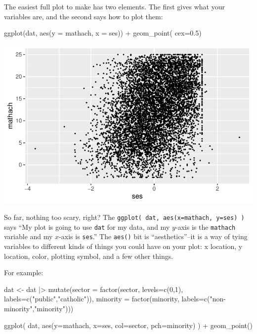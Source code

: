 \documentclass[
  letterpaper,
  DIV=11,
  numbers=noendperiod]{scrreprt}
\newenvironment{Shaded}{}{}
\newcommand{\AttributeTok}[1]{\textcolor[rgb]{0.49,0.56,0.16}{#1}}
\newcommand{\DecValTok}[1]{\textcolor[rgb]{0.25,0.63,0.44}{#1}}
\newcommand{\FloatTok}[1]{\textcolor[rgb]{0.25,0.63,0.44}{#1}}
\newcommand{\FunctionTok}[1]{\textcolor[rgb]{0.02,0.16,0.49}{#1}}
\newcommand{\NormalTok}[1]{#1}
\newcommand{\OtherTok}[1]{\textcolor[rgb]{0.00,0.44,0.13}{#1}}
\newcommand{\SpecialCharTok}[1]{\textcolor[rgb]{0.25,0.44,0.63}{#1}}
\newcommand{\StringTok}[1]{\textcolor[rgb]{0.25,0.44,0.63}{#1}}
\begin{document}
The easiest full plot to make has two elements. The first gives what
your variables are, and the second says how to plot them:

\begin{Shaded}
\begin{Highlighting}[]
\FunctionTok{ggplot}\NormalTok{(dat, }\FunctionTok{aes}\NormalTok{(}\AttributeTok{y =}\NormalTok{ mathach, }\AttributeTok{x =}\NormalTok{ ses)) }\SpecialCharTok{+} 
  \FunctionTok{geom\_point}\NormalTok{( }\AttributeTok{cex=}\FloatTok{0.5}\NormalTok{)}
\end{Highlighting}
\end{Shaded}

\includegraphics{intro_ggplot_files/figure-pdf/unnamed-chunk-2-1.pdf}

So far, nothing too scary, right? The
\texttt{ggplot(\ dat,\ aes(x=mathach,\ y=ses)\ )} says ``My plot is
going to use \texttt{dat} for my data, and my \(y\)-axis is the
\texttt{mathach} variable and my \(x\)-axis is \texttt{ses}.'' The
\texttt{aes()} bit is ``aesthetics''--it is a way of tying variables to
different kinds of things you could have on your plot: x location, y
location, color, plotting symbol, and a few other things.

For example:

\begin{Shaded}
\begin{Highlighting}[]
\NormalTok{dat }\OtherTok{\textless{}{-}}\NormalTok{ dat }\SpecialCharTok{|\textgreater{}} 
  \FunctionTok{mutate}\NormalTok{(}\AttributeTok{sector =} \FunctionTok{factor}\NormalTok{(sector, }\AttributeTok{levels=}\FunctionTok{c}\NormalTok{(}\DecValTok{0}\NormalTok{,}\DecValTok{1}\NormalTok{), }\AttributeTok{labels=}\FunctionTok{c}\NormalTok{(}\StringTok{"public"}\NormalTok{,}\StringTok{"catholic"}\NormalTok{)),}
         \AttributeTok{minority =} \FunctionTok{factor}\NormalTok{(minority, }\AttributeTok{labels=}\FunctionTok{c}\NormalTok{(}\StringTok{"non{-}minority"}\NormalTok{,}\StringTok{"minority"}\NormalTok{)))}

\FunctionTok{ggplot}\NormalTok{( dat, }\FunctionTok{aes}\NormalTok{(}\AttributeTok{y=}\NormalTok{mathach, }\AttributeTok{x=}\NormalTok{ses, }\AttributeTok{col=}\NormalTok{sector, }\AttributeTok{pch=}\NormalTok{minority) ) }\SpecialCharTok{+} 
  \FunctionTok{geom\_point}\NormalTok{()}
\end{Highlighting}
\end{Shaded}
\end{document}
